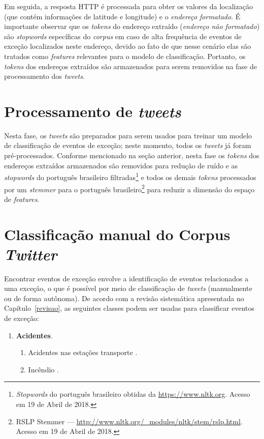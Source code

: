 \documentclass[
	12pt,				%
	oneside,			%
	a4paper,			%
	english,			%
	brazil				%
	]{abntex2ppgsi}
\begin{document}
{{{Em seguida, a resposta HTTP é processada para obter os valores da localização (que contém informações de latitude e longitude) e o \emph{endereço formatado}. É importante observar que os \textit{tokens} do endereço extraído (\emph{endereço não formatado}) são \textit{stopwords} específicas do \textit{corpus} em caso de alta frequência de eventos de exceção localizados neste endereço, devido ao fato de que nesse cenário elas são tratados como \textit{features} relevantes para o modelo de classificação. Portanto, os \textit{tokens} dos endereços extraídos são armazenados para serem removidos na fase de processamento dos \textit{tweets}.

\section{Processamento de \textit{tweets}}
\label{processing}

Nesta fase, os \textit {tweets} são preparados para serem usados para treinar um modelo de classificação de eventos de exceção; neste momento, todos os \textit {tweets} já foram pré-processados. Conforme mencionado na seção anterior, nesta fase os \textit{tokens} dos endereços extraídos armazenados são removidos para redução de ruído e as \textit{stopwords} do português brasileiro filtradas\footnote{\textit{Stopwords} do português brasileiro obtidas da  \url{https://www.nltk.org}. Acesso em 19 de Abril de 2018.} e todos os demais \textit{tokens}  processados por um \textit{stemmer} para o  português brasileiro\footnote{RSLP Stemmer --- \url {http://www.nltk.org/\_modules/nltk/stem/rslp.html}. Acesso em 19 de Abril de 2018.} para reduzir a dimensão do espaço de \textit{features}.

\section{Classificação manual do Corpus \textit{Twitter}}
\label{manualClassification}

Encontrar eventos de exceção envolve a identificação de eventos relacionados a uma exceção, o que é possível por meio de classificação de \textit{tweets} (manualmente ou de forma autônoma). De acordo com a revisão sistemática apresentada no Capítulo~\ref{revisao}, as seguintes classes podem ser usadas para classificar eventos de exceção:

\begin{enumerate}
\item \textbf{Acidentes}.
\begin{enumerate}
\item Acidentes nas estações transporte \cite{Itoh2016}.
\item Incêndio \cite{Itoh2016}.
\end{enumerate}


\end{enumerate}}}}
\end{document}
